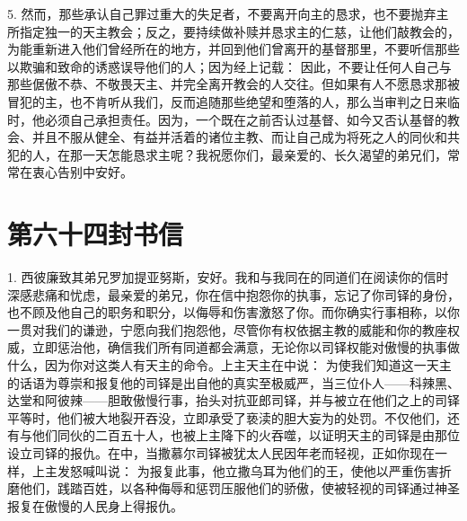 5. 然而，那些承认自己罪过重大的失足者，不要离开向主的恳求，也不要抛弃主所指定独一的天主教会；反之，要持续做补赎并恳求主的仁慈，让他们敲教会的，为能重新进入他们曾经所在的地方，并回到他们曾离开的基督那里，不要听信那些以欺骗和致命的诱惑误导他们的人；因为经上记载： 因此，不要让任何人自己与那些倨傲不恭、不敬畏天主、并完全离开教会的人交往。但如果有人不愿恳求那被冒犯的主，也不肯听从我们，反而追随那些绝望和堕落的人，那么当审判之日来临时，他必须自己承担责任。因为，一个既在之前否认过基督、如今又否认基督的教会、并且不服从健全、有益并活着的诸位主教、而让自己成为将死之人的同伙和共犯的人，在那一天怎能恳求主呢？我祝愿你们，最亲爱的、长久渴望的弟兄们，常常在衷心告别中安好。\par



\section{第六十四封书信}

\par

\par

1. 西彼廉致其弟兄罗加提亚努斯，安好。我和与我同在的同道们在阅读你的信时深感悲痛和忧虑，最亲爱的弟兄，你在信中抱怨你的执事，忘记了你司铎的身份，也不顾及他自己的职务和职分，以侮辱和伤害激怒了你。而你确实行事相称，以你一贯对我们的谦逊，宁愿向我们抱怨他，尽管你有权依据主教的威能和你的教座权威，立即惩治他，确信我们所有同道都会满意，无论你以司铎权能对傲慢的执事做什么，因为你对这类人有天主的命令。上主天主在中说：  为使我们知道这一天主的话语为尊崇和报复他的司铎是出自他的真实至极威严，当三位仆人——科辣黑、达堂和阿彼辣——胆敢傲慢行事，抬头对抗亚郎司铎，并与被立在他们之上的司铎平等时，他们被大地裂开吞没，立即承受了亵渎的胆大妄为的处罚。不仅他们，还有与他们同伙的二百五十人，也被上主降下的火吞噬，以证明天主的司铎是由那位设立司铎的报仇。在中，当撒慕尔司铎被犹太人民因年老而轻视，正如你现在一样，上主发怒喊叫说： 为报复此事，他立撒乌耳为他们的王，使他以严重伤害折磨他们，践踏百姓，以各种侮辱和惩罚压服他们的骄傲，使被轻视的司铎通过神圣报复在傲慢的人民身上得报仇。\par

